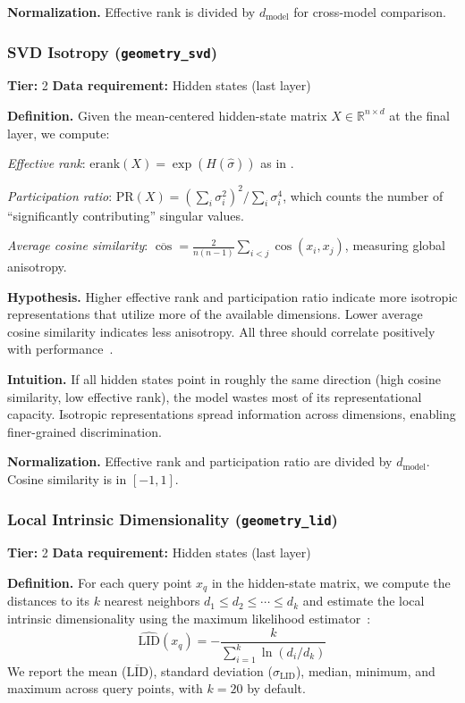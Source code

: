 \documentclass[preprint]{neurips_2025}
\begin{document}
\textbf{Normalization.} Effective rank is divided by $d_{\text{model}}$ for cross-model comparison.

\subsubsection{SVD Isotropy (\texttt{geometry\_svd})}
\label{app:svd}

\textbf{Tier:} 2 \quad \textbf{Data requirement:} Hidden states (last layer)

\textbf{Definition.}
Given the mean-centered hidden-state matrix $X \in \mathbb{R}^{n \times d}$ at the final layer, we compute:

\emph{Effective rank}: $\text{erank}(X) = \exp(H(\hat\sigma))$ as in .

\emph{Participation ratio}: $\text{PR}(X) = (\sum_i \sigma_i^2)^2 / \sum_i \sigma_i^4$, which counts the number of ``significantly contributing'' singular values.

\emph{Average cosine similarity}: $\overline{\cos} = \frac{2}{n(n-1)} \sum_{i<j} \cos(x_i, x_j)$, measuring global anisotropy.

\textbf{Hypothesis.}
Higher effective rank and participation ratio indicate more isotropic representations that utilize more of the available dimensions. Lower average cosine similarity indicates less anisotropy. All three should correlate positively with performance~\citep{ethayarajh2019contextual,cai2021isotropy}.

\textbf{Intuition.}
If all hidden states point in roughly the same direction (high cosine similarity, low effective rank), the model wastes most of its representational capacity. Isotropic representations spread information across dimensions, enabling finer-grained discrimination.

\textbf{Normalization.} Effective rank and participation ratio are divided by $d_{\text{model}}$. Cosine similarity is in $[-1, 1]$.

\subsubsection{Local Intrinsic Dimensionality (\texttt{geometry\_lid})}
\label{app:lid}

\textbf{Tier:} 2 \quad \textbf{Data requirement:} Hidden states (last layer)

\textbf{Definition.}
For each query point $x_q$ in the hidden-state matrix, we compute the distances to its $k$ nearest neighbors $d_1 \leq d_2 \leq \cdots \leq d_k$ and estimate the local intrinsic dimensionality using the maximum likelihood estimator~\citep{levina2004maximum}:
\begin{equation}
  \widehat{\text{LID}}(x_q) = -\frac{k}{\sum_{i=1}^{k} \ln(d_i / d_k)}
\end{equation}
We report the mean ($\overline{\text{LID}}$), standard deviation ($\sigma_{\text{LID}}$), median, minimum, and maximum across query points, with $k=20$ by default.
\end{document}
